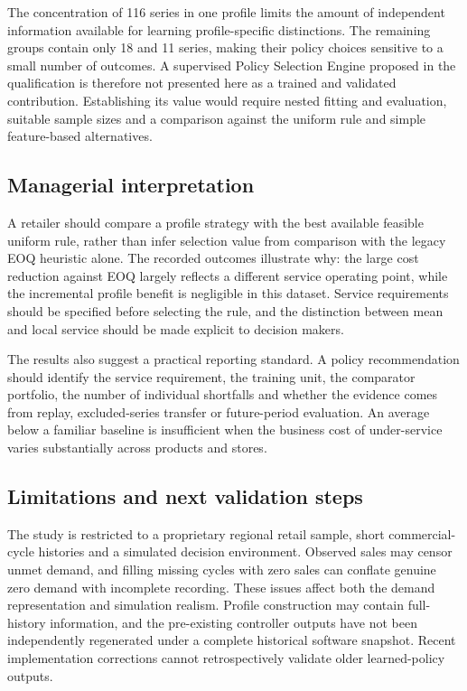 \documentclass[preprint,12pt]{elsarticle}
\begin{document}
The concentration of 116 series in one profile limits the amount of independent information available for learning profile-specific distinctions. The remaining groups contain only 18 and 11 series, making their policy choices sensitive to a small number of outcomes. A supervised Policy Selection Engine proposed in the qualification is therefore not presented here as a trained and validated contribution. Establishing its value would require nested fitting and evaluation, suitable sample sizes and a comparison against the uniform rule and simple feature-based alternatives.

\subsection{Managerial interpretation}
A retailer should compare a profile strategy with the best available feasible uniform rule, rather than infer selection value from comparison with the legacy EOQ heuristic alone. The recorded outcomes illustrate why: the large cost reduction against EOQ largely reflects a different service operating point, while the incremental profile benefit is negligible in this dataset. Service requirements should be specified before selecting the rule, and the distinction between mean and local service should be made explicit to decision makers.

The results also suggest a practical reporting standard. A policy recommendation should identify the service requirement, the training unit, the comparator portfolio, the number of individual shortfalls and whether the evidence comes from replay, excluded-series transfer or future-period evaluation. An average below a familiar baseline is insufficient when the business cost of under-service varies substantially across products and stores.

\subsection{Limitations and next validation steps}
The study is restricted to a proprietary regional retail sample, short commercial-cycle histories and a simulated decision environment. Observed sales may censor unmet demand, and filling missing cycles with zero sales can conflate genuine zero demand with incomplete recording. These issues affect both the demand representation and simulation realism. Profile construction may contain full-history information, and the pre-existing controller outputs have not been independently regenerated under a complete historical software snapshot. Recent implementation corrections cannot retrospectively validate older learned-policy outputs.
\end{document}
